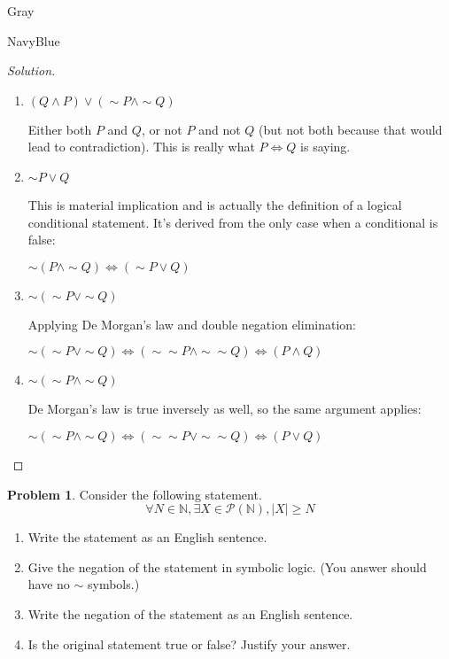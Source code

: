\documentclass[12pt]{amsart}
\newcounter{problem_number}[section]
\theoremstyle{named}
\newenvironment{soln}
{\begin{color}{Gray}\begin{framed}\begin{color}{NavyBlue}\begin{proof}[Solution]
\doublespacing}
{\end{proof}\end{color}\end{framed}\end{color}}
\theoremstyle{definition}
\newtheorem{problem}{Problem}
\newcommand{\N}{\mathbb N}
\begin{document}
\begin{soln}
	\phantom{ }
	\begin{enumerate}
		\item $(Q \land P) \lor (\sim P \land \sim Q)$
		
		\noindent Either both $P$ and $Q$, or not $P$ and not $Q$ (but not both because
		that would lead to contradiction). This is really what $P \Leftrightarrow Q$ is 
		saying.

		\phantom{ }



		\item $\sim P \lor Q$
		
		\noindent This is material implication and is actually the definition of a 
		logical conditional statement. It's derived from the only case when a 
		conditional is false: 
		
		\noindent $\sim (P \land \sim Q) \iff (\sim P \lor Q)$

		\phantom{ }



		\item $\sim (\sim P \lor \sim Q)$
		
		\noindent Applying De Morgan's law and double negation elimination: 
		
		\noindent $\sim (\sim P \lor \sim Q) \iff (\sim \sim P \land \sim \sim Q)
		\iff (P \land Q)$

		\phantom{ }


		
		\item $\sim (\sim P \land \sim Q)$
		
		\noindent De Morgan's law is true inversely as well, so the same argument
		applies:
		
		\noindent $\sim (\sim P \land \sim Q) \iff (\sim \sim P \lor \sim \sim Q)
		\iff (P \lor Q)$
	\end{enumerate}
\end{soln}
\begin{problem}
	Consider the following statement.
$$\forall N\in\N,\exists X\in\mathscr P(\N),|X|\geq N$$

	\begin{enumerate}
		\item Write the statement as an English sentence.
		\item Give the negation of the statement in symbolic logic. (You answer should have no $\sim$ symbols.)
		\item Write the negation of the statement as an English sentence.
		\item Is the original statement true or false? Justify your answer.
	\end{enumerate}
\end{problem}
\end{document}
